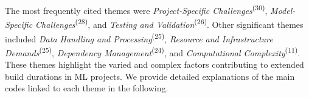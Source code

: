 
The most frequently cited themes  were \textit{Project-Specific Challenges}\textsuperscript{(30)}, \textit{Model-Specific Challenges}\textsuperscript{(28)}, and \textit{Testing and Validation}\textsuperscript{(26)}. Other significant themes included \textit{Data Handling and Processing}\textsuperscript{(25)}, \textit{Resource and Infrastructure Demands}\textsuperscript{(25)}, \textit{Dependency Management}\textsuperscript{(24)}, and \textit{Computational Complexity}\textsuperscript{(11)}. These themes highlight the varied and complex factors contributing to extended build durations in ML projects.
We provide detailed explanations of the main codes linked to each theme in the following.

